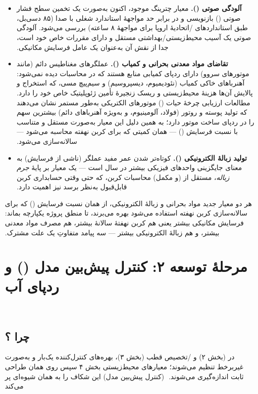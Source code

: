 ‫\documentclass[a4paper,12pt]{article}
\begin{document}
‫\begin{itemize}
‫\item \textbf{آلودگی صوتی ().} معیار
‫چترینگ موجود، اکنون به‌صورت یک تخمین سطح فشار صوتی ()
‫بازنویسی و در برابر حد مواجههٔ استاندارد شغلی با صدا (۸۵ دسی‌بل، طبق
‫استانداردهای /اتحادیهٔ اروپا برای مواجههٔ ۸ ساعته) بررسی
‫می‌شود. آلودگی صوتی یک آسیب محیط‌زیستی/بهداشتی مستقل و دارای مقررات
‫خاص خود است، جدا از نقش آن به‌عنوان یک عامل فرسایش مکانیکی.
‫
‫\item \textbf{تقاضای مواد معدنی بحرانی و کمیاب ().} عملگرهای مغناطیس دائم (مانند موتورهای
‫سروو) دارای ردپای کمیابی منابع هستند که در محاسبات 
‫دیده نمی‌شود: آهنرباهای خاکی کمیاب (نئودیمیوم، دیسپروسیم) و سیم‌پیچ
‫مسی، که استخراج و پالایش آن‌ها هزینهٔ محیط‌زیستی و ریسک زنجیرهٔ
‫تأمین ژئوپلیتیک خاص خود را دارد. مطالعات ارزیابی چرخهٔ حیات
‫() موتورهای الکتریکی به‌طور مستمر نشان می‌دهند که تولید
‫پوسته و روتور (فولاد، آلومینیوم، و به‌ویژه آهنرباهای دائم) بیشترین
‫سهم را در ردپای ساخت موتور دارد؛ به همین دلیل این معیار به‌صورت
‫مستقل و متناسب با نسبت فرسایش (\texttt{}) — همان کمیتی که
‫برای کربن نهفته محاسبه می‌شود — سالانه‌سازی می‌شود.
‫
‫\item \textbf{تولید زبالهٔ الکترونیکی ().} کوتاه‌تر
‫شدن عمر مفید عملگر (ناشی از فرسایش) به معنای جایگزینی واحدهای
‫فیزیکی بیشتر در سال است — یک معیار بر پایهٔ \emph{جرم زباله}، مستقل
‫از (و مکمل) محاسبات کربن، که حتی وقتی حسابداری کربن قابل‌قبول
‫به‌نظر برسد نیز اهمیت دارد.
‫\end{itemize}
‫
‫هر دو معیار جدید مواد بحرانی و زبالهٔ الکترونیکی، از همان نسبت فرسایش
‫(\texttt{}) که برای سالانه‌سازی کربن نهفته استفاده می‌شود
‫بهره می‌برند، تا منطق پروژه یکپارچه بماند: فرسایش مکانیکی بیشتر
‫یعنی هم کربن نهفتهٔ سالانهٔ بیشتر، هم مصرف مواد معدنی بیشتر، و هم
‫زبالهٔ الکترونیکی بیشتر — سه پیامد متفاوتِ یک علت مشترک.
‫
‫\section{مرحلهٔ توسعه ۲: کنترل پیش‌بین مدل () و ردپای آب}
‫
‫\subsection{چرا ؟}
‫در  (بخش ۲) و /تخصیص قطب (بخش ۳)، بهره‌های
‫کنترل‌کننده یک‌بار و به‌صورت غیربرخط تنظیم می‌شوند؛ معیارهای
‫محیط‌زیستی بخش ۴ سپس روی همان طراحی ثابت اندازه‌گیری می‌شوند.
‫ (کنترل پیش‌بین مدل) این شکاف را به همان شیوه‌ای پر می‌کند
\end{document}
